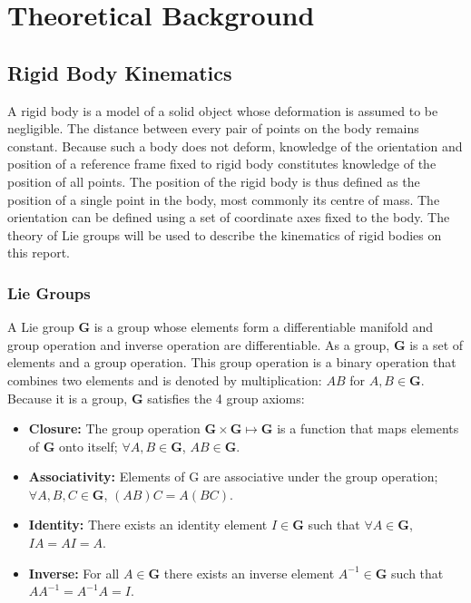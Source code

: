 \chapter{Theoretical Background}

\section{Rigid Body Kinematics}
	A rigid body is a model of a solid object whose deformation is assumed to be negligible. The distance between every pair of points on the body remains constant. Because such a body does not deform, knowledge of the orientation and position of a reference frame fixed to rigid body constitutes knowledge of the position of all points. The position of the rigid body is thus defined as the position of a single point in the body, most commonly its centre of mass. The orientation can be defined using a set of coordinate axes fixed to the body.
	The theory of Lie groups will be used to describe the kinematics of rigid bodies on this report.
			
	\subsection{Lie Groups}		
		A Lie group $\mathbf{G}$ is a group whose elements form a differentiable manifold and group operation and inverse operation are differentiable.
		As a group, $\mathbf{G}$ is a set of elements and a group operation. This group operation is a binary operation that combines two elements and is denoted by multiplication: $AB$ for $A,B \in \mathbf{G}$. Because it is a group, $\mathbf{G}$ satisfies the 4 group axioms:
		\begin{itemize}
		\item \textbf{Closure:} 
			The group operation
			$\mathbf{G} \times \mathbf{G} \mapsto \mathbf{G}$ 
			is a function that maps elements of $\mathbf{G}$ onto itself;
			$\forall A,B \in \mathbf{G}$, $AB \in \mathbf{G}$.
		\item \textbf{Associativity:} Elements of G are associative under the group operation;
			$\forall A,B,C \in \mathbf{G}$, $(AB)C=A(BC)$.
		\item \textbf{Identity:} There exists an identity element $I \in \mathbf{G}$  such that
			$\forall A \in \mathbf{G}$, $IA = AI = A$.
		\item \textbf{Inverse:} For all $A \in \mathbf{G}$ there exists an inverse element $A^{-1} \in \mathbf{G}$ such that $AA^{-1}=A^{-1}A=I$. 
		\end{itemize}
		
